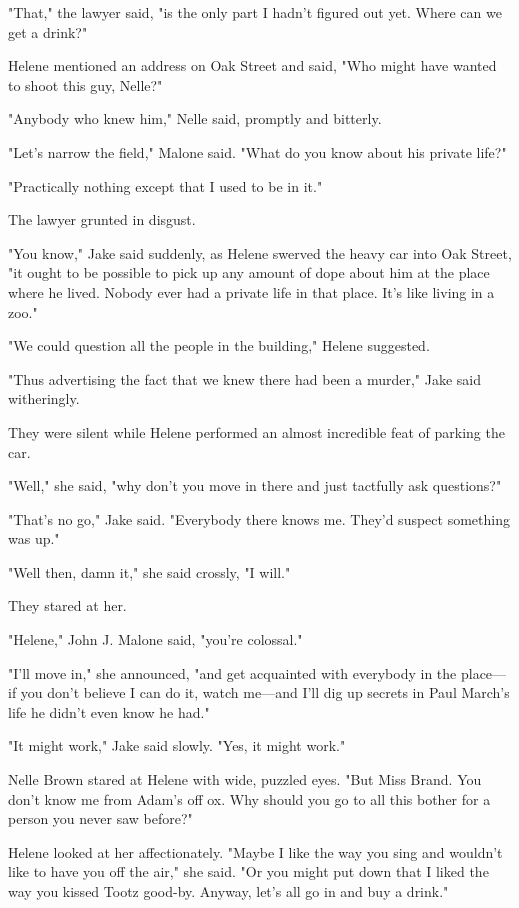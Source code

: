 \documentclass{novel}
\begin{document}
"That," the lawyer said, "is the only part I hadn't figured out yet. Where can we get a drink?"

Helene mentioned an address on Oak Street and said, "Who might have wanted to shoot this guy, Nelle?"

"Anybody who knew him," Nelle said, promptly and bitterly.

"Let’s narrow the field," Malone said. "What do you know about his private life?"

"Practically nothing except that I used to be in it."

The lawyer grunted in disgust.

"You know," Jake said suddenly, as Helene swerved the heavy car into Oak Street, "it ought to be possible to pick up any amount of dope about him at the place where he lived. Nobody ever had a private life in that place. It’s like living in a zoo."

"We could question all the people in the building," Helene suggested.

"Thus advertising the fact that we knew there had been a murder," Jake said witheringly.

They were silent while Helene performed an almost incredible feat of parking the car.

"Well," she said, "why don’t you move in there and just tactfully ask questions?"

"That’s no go," Jake said. "Everybody there knows me. They’d suspect something was up."

"Well then, damn it," she said crossly, "I will."

They stared at her.

"Helene," John J. Malone said, "you’re colossal."

"I'll move in," she announced, "and get acquainted with everybody in the place—if you don’t believe I can do it, watch me—and I'll dig up secrets in Paul March’s life he didn’t even know he had."

"It might work," Jake said slowly. "Yes, it might work."

Nelle Brown stared at Helene with wide, puzzled eyes. "But Miss Brand. You don’t know me from Adam’s off ox. Why should you go to all this bother for a person you never saw before?"

Helene looked at her affectionately. "Maybe I like the way you sing and wouldn’t like to have you off the air," she said. "Or you might put down that I liked the way you kissed Tootz good-by. Anyway, let’s all go in and buy a drink."
\end{document}
